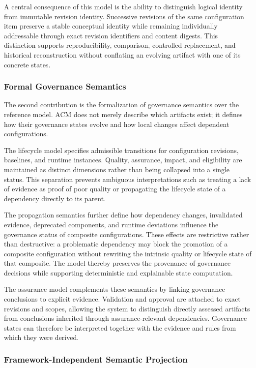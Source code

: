 \documentclass[10pt]{article}
\begin{document}
A central consequence of this model is the ability to distinguish logical identity from immutable revision identity. Successive revisions of the same configuration item preserve a stable conceptual identity while remaining individually addressable through exact revision identifiers and content digests. This distinction supports reproducibility, comparison, controlled replacement, and historical reconstruction without conflating an evolving artifact with one of its concrete states.

\subsubsection{Formal Governance Semantics}

The second contribution is the formalization of governance semantics over the reference model. ACM does not merely describe which artifacts exist; it defines how their governance states evolve and how local changes affect dependent configurations.

The lifecycle model specifies admissible transitions for configuration revisions, baselines, and runtime instances. Quality, assurance, impact, and eligibility are maintained as distinct dimensions rather than being collapsed into a single status. This separation prevents ambiguous interpretations such as treating a lack of evidence as proof of poor quality or propagating the lifecycle state of a dependency directly to its parent.

The propagation semantics further define how dependency changes, invalidated evidence, deprecated components, and runtime deviations influence the governance status of composite configurations. These effects are restrictive rather than destructive: a problematic dependency may block the promotion of a composite configuration without rewriting the intrinsic quality or lifecycle state of that composite. The model thereby preserves the provenance of governance decisions while supporting deterministic and explainable state computation.

The assurance model complements these semantics by linking governance conclusions to explicit evidence. Validation and approval are attached to exact revisions and scopes, allowing the system to distinguish directly assessed artifacts from conclusions inherited through assurance-relevant dependencies. Governance states can therefore be interpreted together with the evidence and rules from which they were derived.

\subsubsection{Framework-Independent Semantic Projection}
\end{document}

